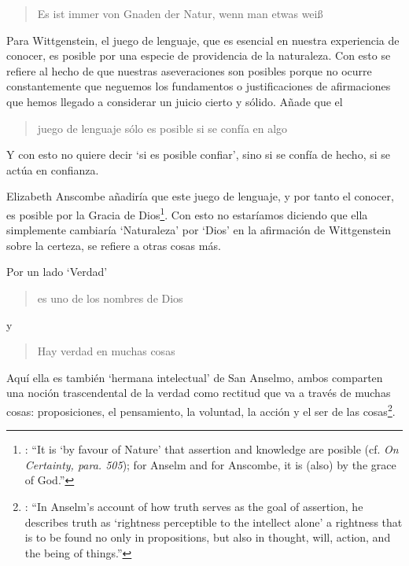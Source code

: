 \blockquote[{\Cite[\S505]{wittgenstein1969oncertes}}]{Es ist immer von Gnaden der Natur, wenn man etwas weiß}. Para Wittgenstein, el juego de lenguaje, que es esencial en nuestra experiencia de conocer, es posible por una especie de providencia de la naturaleza. Con esto se refiere al hecho de que nuestras aseveraciones son posibles porque no ocurre constantemente que neguemos los fundamentos o justificaciones de afirmaciones que hemos llegado a considerar un juicio cierto y sólido. Añade que el \blockquote[{\Cite[\S509]{wittgenstein1969oncertes}}]{juego de lenguaje sólo es posible si se confía en algo}. Y con esto no quiere decir \enquote*{si es posible confiar}, sino si se confía de hecho, si se actúa en confianza.

Elizabeth Anscombe añadiría que este juego de lenguaje, y por tanto el conocer, es posible por la Gracia de Dios\footnote{\Cite[Cf.][224]{teichmann2008ans}: \enquote{It is `by favour of Nature' that assertion and knowledge are posible (cf. \emph{On Certainty, para. 505}); for Anselm and for Anscombe, it is (also) by the grace of God.}}. Con esto no estaríamos diciendo que ella simplemente cambiaría `Naturaleza' por `Dios' en la afirmación de Wittgenstein sobre la certeza, se refiere a otras cosas más.

Por un lado `Verdad' \blockquote[{\Cite[47]{torralbaynubiola2005fayeh:verdad}}]{es uno de los nombres de Dios} y \blockquote[{\Cite[47]{torralbaynubiola2005fayeh:verdad}}]{Hay verdad en muchas cosas}. Aquí ella es también `hermana intelectual' de San Anselmo, ambos comparten una noción trascendental de la verdad como rectitud que va a través de muchas cosas: proposiciones, el pensamiento, la voluntad, la acción y el ser de las cosas\footnote{\Cite[Cf.][197]{teichmann2008ans}: \enquote{In Anselm's account of how truth serves as the goal of assertion, he describes truth as `rightness perceptible to the intellect alone' \textelp{} a rightness that is to be found no only in propositions, but also in thought, will, action, and the being of things.}}.


